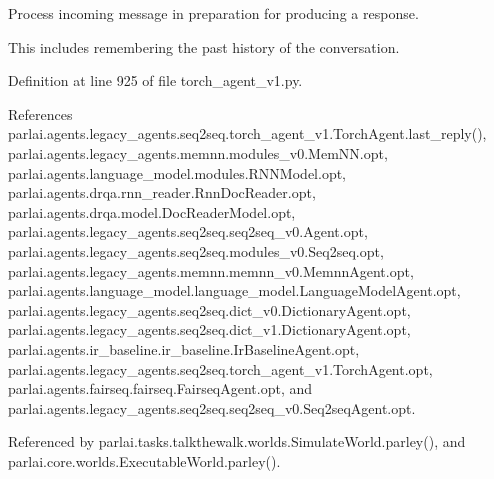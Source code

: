 \begin{DoxyVerb}Process incoming message in preparation for producing a response.

This includes remembering the past history of the conversation.
\end{DoxyVerb}
 

Definition at line 925 of file torch\+\_\+agent\+\_\+v1.\+py.



References parlai.\+agents.\+legacy\+\_\+agents.\+seq2seq.\+torch\+\_\+agent\+\_\+v1.\+Torch\+Agent.\+last\+\_\+reply(), parlai.\+agents.\+legacy\+\_\+agents.\+memnn.\+modules\+\_\+v0.\+Mem\+N\+N.\+opt, parlai.\+agents.\+language\+\_\+model.\+modules.\+R\+N\+N\+Model.\+opt, parlai.\+agents.\+drqa.\+rnn\+\_\+reader.\+Rnn\+Doc\+Reader.\+opt, parlai.\+agents.\+drqa.\+model.\+Doc\+Reader\+Model.\+opt, parlai.\+agents.\+legacy\+\_\+agents.\+seq2seq.\+seq2seq\+\_\+v0.\+Agent.\+opt, parlai.\+agents.\+legacy\+\_\+agents.\+seq2seq.\+modules\+\_\+v0.\+Seq2seq.\+opt, parlai.\+agents.\+legacy\+\_\+agents.\+memnn.\+memnn\+\_\+v0.\+Memnn\+Agent.\+opt, parlai.\+agents.\+language\+\_\+model.\+language\+\_\+model.\+Language\+Model\+Agent.\+opt, parlai.\+agents.\+legacy\+\_\+agents.\+seq2seq.\+dict\+\_\+v0.\+Dictionary\+Agent.\+opt, parlai.\+agents.\+legacy\+\_\+agents.\+seq2seq.\+dict\+\_\+v1.\+Dictionary\+Agent.\+opt, parlai.\+agents.\+ir\+\_\+baseline.\+ir\+\_\+baseline.\+Ir\+Baseline\+Agent.\+opt, parlai.\+agents.\+legacy\+\_\+agents.\+seq2seq.\+torch\+\_\+agent\+\_\+v1.\+Torch\+Agent.\+opt, parlai.\+agents.\+fairseq.\+fairseq.\+Fairseq\+Agent.\+opt, and parlai.\+agents.\+legacy\+\_\+agents.\+seq2seq.\+seq2seq\+\_\+v0.\+Seq2seq\+Agent.\+opt.



Referenced by parlai.\+tasks.\+talkthewalk.\+worlds.\+Simulate\+World.\+parley(), and parlai.\+core.\+worlds.\+Executable\+World.\+parley().

